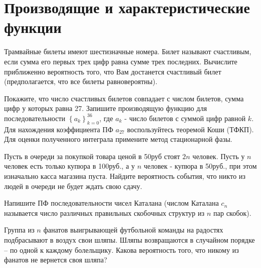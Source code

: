 \section{Производящие и характеристические функции}

\begin{problem}
Трамвайные билеты имеют шестизначные номера. Билет называют счастливым, если 
сумма его первых трех цифр равна сумме трех последних. Вычислите приближенно 
вероятность того, что Вам достанется счастливый билет (предполагается, что 
все билеты равновероятны).

\end{problem}

\begin{ordre}
Покажите, что число счастливых билетов совпадает с числом билетов, 
сумма цифр у которых равна 27. Запишите производящую функцию для 
последовательности $\left\{ {a_k } \right\}_{k=0}^{36} $, где $a_k $ - число 
билетов с суммой цифр равной $k$. Для нахождения коэффициента ПФ $a_{27} $ 
воспользуйтесь теоремой Коши (ТФКП). Для оценки полученного интеграла примените 
метод стационарной фазы.
\end{ordre}

\begin{problem}
Пусть в очереди за покупкой товара ценой в 
50руб стоят $2n$ человек. Пусть у $n$ человек есть только купюра в 100руб., 
а у $n$ человек - купюра в 50руб., при этом изначально касса магазина пуста. 
Найдите вероятность события, что никто из людей в очереди не будет ждать 
свою сдачу.
\end{problem}

\begin{ordre}
Напишите ПФ последовательности чисел Каталана (числом Каталана 
$c_n $ называется число различных правильных скобочных структур из $n$ пар 
скобок).
\end{ordre}


\begin{problem}
Группа из $n$ фанатов выигрывающей футбольной команды на радостях 
подбрасывают в воздух свои шляпы. Шляпы возвращаются в случайном порядке -- 
по одной к каждому болельщику. Какова вероятность того, что никому из 
фанатов не вернется своя шляпа?
\end{problem}

